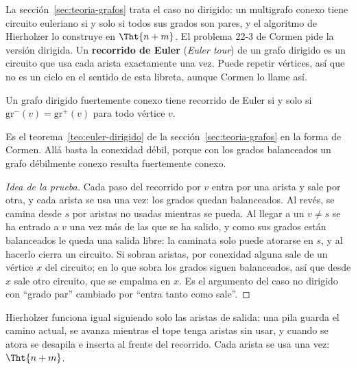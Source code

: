 \documentclass[11pt,letterpaper]{article}
\begin{document}
La sección~\ref{sec:teoria-grafos} trata el caso no dirigido: un
multigrafo conexo tiene circuito euleriano si y solo si todos sus
grados son pares, y el algoritmo de Hierholzer lo construye en
$\Tht{n + m}$. El problema 22-3 de Cormen pide la versión dirigida. Un
\textbf{recorrido de Euler} (\textit{Euler tour}) de un grafo dirigido
es un circuito que usa cada arista exactamente una vez. Puede repetir
vértices, así que no es un ciclo en el sentido de esta libreta, aunque
Cormen lo llame así.

\begin{teorema}
  \label{teo:euler-dirigido-cormen}
  Un grafo dirigido fuertemente conexo tiene recorrido de Euler si y
  solo si $\text{gr}^{-}(v) = \text{gr}^{+}(v)$ para todo vértice $v$.
\end{teorema}

Es el teorema~\ref{teo:euler-dirigido} de la
sección~\ref{sec:teoria-grafos} en la forma de Cormen. Allá basta la
conexidad débil, porque con los grados balanceados un grafo débilmente
conexo resulta fuertemente conexo.

\begin{proof}[Idea de la prueba]
  Cada paso del recorrido por $v$ entra por una arista y sale por otra,
  y cada arista se usa una vez: los grados quedan balanceados. Al
  revés, se camina desde $s$ por aristas no usadas mientras se pueda.
  Al llegar a un $v \neq s$ se ha entrado a $v$ una vez más de las que
  se ha salido, y como sus grados están balanceados le queda una salida
  libre: la caminata solo puede atorarse en $s$, y al hacerlo cierra un
  circuito. Si sobran aristas, por conexidad alguna sale de un vértice
  $x$ del circuito; en lo que sobra los grados siguen balanceados, así
  que desde $x$ sale otro circuito, que se empalma en $x$. Es el
  argumento del caso no dirigido con ``grado par'' cambiado por
  ``entra tanto como sale''.
\end{proof}

Hierholzer funciona igual siguiendo solo las aristas de salida: una
pila guarda el camino actual, se avanza mientras el tope tenga aristas
sin usar, y cuando se atora se desapila e inserta al frente del
recorrido. Cada arista se usa una vez: $\Tht{n + m}$.
\end{document}
